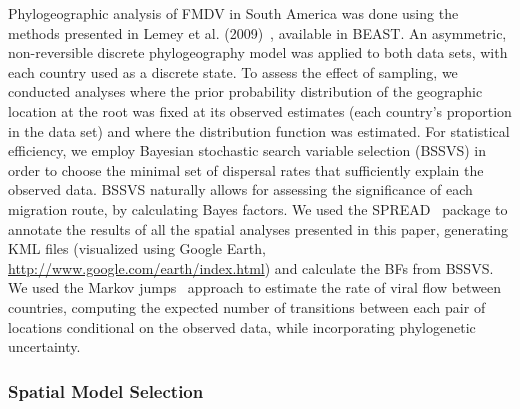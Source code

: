 \documentclass[10pt]{article}
\begin{document}
Phylogeographic analysis of FMDV in South America was done using the methods presented in Lemey et al. (2009)~\cite{roots}, available in BEAST. 
An asymmetric, non-reversible discrete phylogeography model was applied to both data sets, with each country used as a discrete state.
To assess the effect of sampling, we conducted analyses where the prior probability distribution of the geographic location at the   root was fixed at its observed estimates (each country's proportion in the data set) and where the distribution function was estimated.
For statistical efficiency, we employ Bayesian stochastic search variable selection (BSSVS) in order to choose the minimal set of dispersal rates that sufficiently explain the observed data.
BSSVS naturally allows for assessing the significance of each migration route, by calculating Bayes factors.
We used the SPREAD~\cite{spread} package to annotate the results of all the spatial analyses presented in this paper, generating KML files (visualized using Google Earth, \url{http://www.google.com/earth/index.html}) and calculate the BFs from BSSVS.
We used the Markov jumps~\cite{Minin2008} approach to estimate the rate of viral flow between countries, computing the expected number of transitions between each pair of locations conditional on the observed data, while incorporating phylogenetic uncertainty.

\subsubsection*{Spatial Model Selection}
\end{document}
